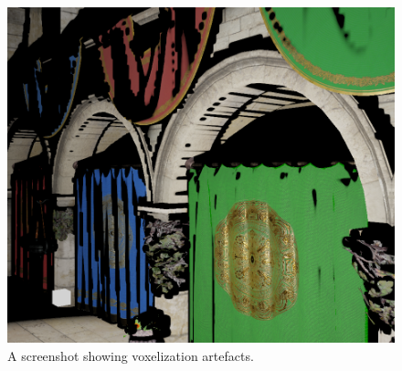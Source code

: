 \documentclass[]{acmsiggraph}
\begin{document}
\begin{figure}[htbp]\centering
 \includegraphics[width=1.0\linewidth]{images/voxelization_error.png}
 \caption{A screenshot showing voxelization artefacts.}
\end{figure}



\end{document}
